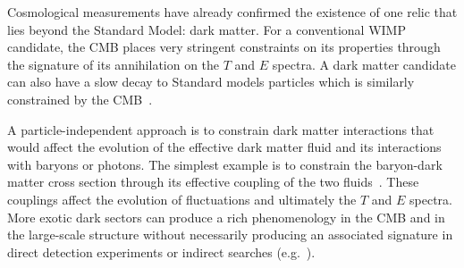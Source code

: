 %

Cosmological measurements have already confirmed the existence of one relic that lies beyond the 
Standard Model: dark matter. For a conventional WIMP candidate, the CMB places very stringent 
constraints on its properties through the signature of its annihilation on the $T$ and $E$ 
spectra\citep{Peebles2000, Chen2004, Padmanabhan2005}.  
A dark matter candidate can also have a slow decay to Standard models particles which is 
similarly constrained by the CMB~\cite{Chen2004, Zhang2007, Diamanti2014, Slatyer:2016qyl}.


A particle-independent approach is to constrain dark matter interactions that would 
affect the evolution of the effective dark matter fluid and its interactions with baryons or photons.  The simplest example is 
to constrain the baryon-dark matter cross section through its effective coupling of the two fluids~\cite{Dvorkin:2013cea}.  
These couplings affect the evolution of fluctuations and ultimately the $T$ and $E$ spectra.  
More exotic dark sectors can produce a rich phenomenology in the CMB and in the large-scale structure 
without necessarily producing an associated signature in direct detection experiments or 
indirect searches (e.g.~\cite{Cyr-Racine:2013fsa,Buen-Abad:2015ova,Lesgourgues:2015wza}). 


